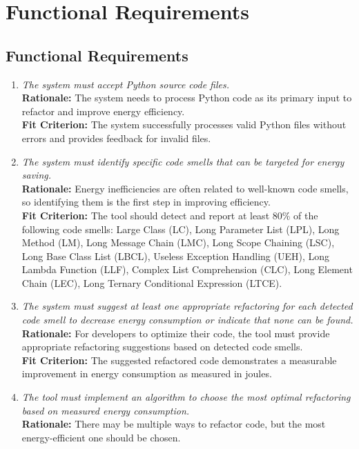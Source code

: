 \documentclass[12pt]{article}
\begin{document}
\section{Functional Requirements}
\subsection{Functional Requirements}
\begin{enumerate}[label=FR \arabic*., wide=0pt, leftmargin=*]
    \item \emph{The system must accept Python source code files.}\\[2mm]
    {\bf Rationale:} The system needs to process Python code as its primary input to refactor and improve energy efficiency.\\
    {\bf Fit Criterion:} The system successfully processes valid Python files without errors and provides feedback for invalid files.
    \item \emph{The system must identify specific code smells that can be targeted for energy saving.}\\[2mm]
    {\bf Rationale:} Energy inefficiencies are often related to well-known code smells, so identifying them is the first step in improving efficiency.\\
    {\bf Fit Criterion:} The tool should detect and report at least 80\% of the following code smells: Large Class (LC), Long Parameter List (LPL), Long Method (LM), Long Message Chain (LMC), Long Scope Chaining (LSC), Long Base Class List (LBCL), Useless Exception Handling (UEH), Long Lambda Function (LLF), Complex List Comprehension (CLC), Long Element Chain (LEC), Long Ternary Conditional Expression (LTCE).
    \item \emph{The system must suggest at least one appropriate refactoring for each detected code smell to decrease energy consumption or indicate that none can be found.}\\[2mm]
    {\bf Rationale:} For developers to optimize their code, the tool must provide appropriate refactoring suggestions based on detected code smells.\\
    {\bf Fit Criterion:} The suggested refactored code demonstrates a measurable improvement in energy consumption as measured in joules.
    \item \emph{The tool must implement an algorithm to choose the most optimal refactoring based on measured energy consumption.}\\[2mm]
    {\bf Rationale:} There may be multiple ways to refactor code, but the most energy-efficient one should be chosen.\\

\end{enumerate}
\end{document}
